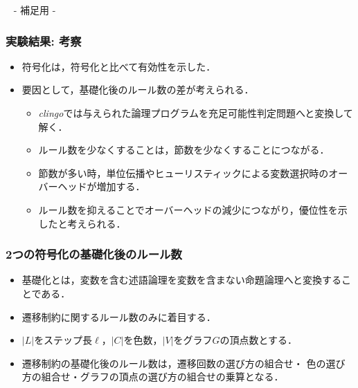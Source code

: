 \appendix
\backupbegin

\begin{frame}{~}
 \centering
 - 補足用 -
\end{frame} 

\begin{frame}\frametitle{実験結果: 考察}

  \begin{itemize}
    \item {}符号化は，符号化と比べて有効性を示した．
    \item 要因として，\alert{基礎化後のルール数の差}が考えられる．
    \begin{itemize}
      \item \textit{clingo}では与えられた論理プログラムを充足可能性判定問題へと変換して解く．
      \item ルール数を少なくすることは，節数を少なくすることにつながる．
      \item 節数が多い時，単位伝播やヒューリスティックによる変数選択時のオーバーヘッドが増加する．
      \item ルール数を抑えることでオーバーヘッドの減少につながり，優位性を示したと考えられる．
    \end{itemize}
  \end{itemize}
  
\end{frame}

%  

\begin{frame}\frametitle{2つの符号化の基礎化後のルール数}

  \begin{itemize}
    \item 基礎化とは，変数を含む述語論理を変数を含まない命題論理へと変換することである．
    \item 遷移制約に関するルール数のみに着目する．
    \item $|L|$をステップ長$\ell$，$|C|$を色数，$|V|$をグラフ$G$の頂点数とする．
  \end{itemize}

  \begin{exampleblock}{}
    \centering
    
  \end{exampleblock}

  \begin{itemize}
    \item 遷移制約の基礎化後のルール数は，遷移回数の選び方の組合せ・
          色の選び方の組合せ・グラフの頂点の選び方の組合せの乗算となる．
  \end{itemize}

\end{frame}

